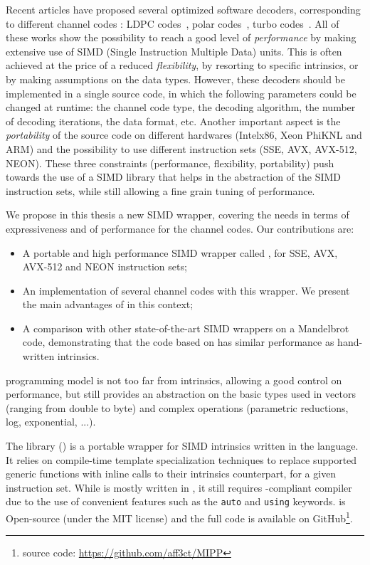 Recent articles have proposed several optimized software decoders, corresponding
to different channel codes : LDPC codes~\cite{LeGal2015,LeGal2016}, polar
codes~\cite{Giard2016b,Sarkis2016,Cassagne2015c,Cassagne2016b}, turbo
codes~\cite{Zhang2012,Wu2013,Cassagne2016a}. All of these works show the
possibility to reach a good level of \textit{performance} by  making extensive
use of SIMD (Single Instruction Multiple Data) units. This is often achieved at
the price of a reduced \textit{flexibility}, by resorting to specific
intrinsics, or by making assumptions on the data types. However, these decoders
should be implemented in a single source code, in which the following parameters
could be changed at runtime: the channel code type, the decoding algorithm, the
number of decoding iterations, the data format, etc. Another important aspect is
the \textit{portability} of the source code on different hardwares (Intel\R x86,
Xeon Phi\TM KNL and ARM\R) and the possibility to use different instruction sets
(SSE, AVX, AVX-512, NEON). These three constraints (performance, flexibility,
portability) push towards the use of a SIMD library that helps in the
abstraction of the SIMD instruction sets, while still allowing a fine grain
tuning of performance.

We propose in this thesis a new \Cxx SIMD wrapper, covering the needs in terms
of expressiveness and of performance for the channel codes. Our contributions
are:
\begin{itemize}
  \item A portable and high performance  \Cxx SIMD wrapper called \MIPP, for
    SSE, AVX, AVX-512 and NEON instruction sets;
  \item An implementation of several channel codes with this wrapper. We
    present the main advantages of \MIPP in this context;
  \item A comparison with other state-of-the-art SIMD wrappers on a Mandelbrot
    code, demonstrating that the code based on \MIPP has similar performance as
    hand-written intrinsics.
\end{itemize}
\MIPP programming model is not too far from intrinsics, allowing a good control
on performance, but still provides an abstraction on the basic types used in
vectors (ranging from double to byte) and complex operations (parametric
reductions, log, exponential, ...).

The \longMIPP library (\MIPP) is a portable wrapper for SIMD intrinsics written
in the \Cxx language. It relies on \Cxx compile-time template specialization
techniques to replace supported generic functions with inline calls to their
intrinsics counterpart, for a given instruction set. While \MIPP is mostly
written in , it still requires -compliant compiler due to the
use of convenient features such as the \verb|auto| and \verb|using| keywords.
\MIPP is Open-source (under the MIT license) and the full code is available on
GitHub\footnote{\MIPP source code: \url{https://github.com/aff3ct/MIPP}}.

